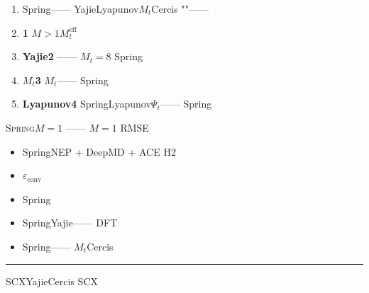 \documentclass[12pt,a4paper]{article}
\theoremstyle{remark}
\newcommand{\Spring}{\textsc{Spring}}
\newcommand{\Lyap}{\ensuremath{\Psi}}
\begin{document}
\begin{enumerate}[label=(\arabic*),itemsep=4pt]
    \item \textbf{}
    Spring——
    YajieLyapunov$M_t$Cercis
    ""——

    \item \textbf{1}
    $M>1$$M_t^{\text{eff}}$
    

    \item \textbf{Yajie2}
    ——
    $M_t=8$
    Spring\textit{}

    \item \textbf{$M_t$3}
    $M_t$——
    Spring

    \item \textbf{Lyapunov4}
    SpringLyapunov$\Lyap_t$——
    Spring
\end{enumerate}

\Spring{}\textbf{$M=1$}
——
$M=1$
RMSE



\begin{itemize}[nosep]
    \item \textbf{} SpringNEP + DeepMD + ACE
    H2
    \item \textbf{} $\varepsilon_{\text{conv}}$
    \item \textbf{} 
    Spring
    \item \textbf{} SpringYajie——
    DFT
    \item \textbf{} Spring——
    $M_t$Cercis
\end{itemize}

\vspace{12pt}
\noindent\rule{\textwidth}{0.4pt}
\vspace{6pt}

\noindent\textbf{} 
SCXYajieCercis
SCX
\end{document}

